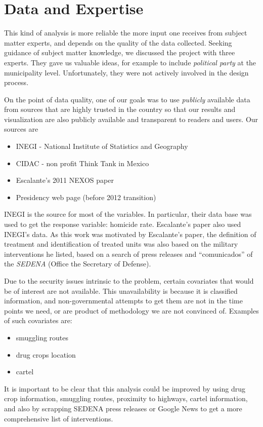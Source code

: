\documentclass{article}[11 pt]
\begin{document}
\section{Data and Expertise}
This kind of analysis is more reliable the more input one receives from subject matter experts, and depends on the quality of the data collected. Seeking guidance of subject matter knowledge, we discussed the project with three experts. %
They gave us valuable ideas, for example to include \emph{political party} at the municipality level. Unfortunately, they were not actively involved in the design process.

On the point of data quality, one of our goals was to use \emph{publicly} available data from sources that are highly trusted in the country so that our results and visualization are also publicly available and transparent to readers and users.
Our sources are
		\begin{itemize}
			\item INEGI - National Institute of Statistics and Geography
			\item CIDAC -  non profit Think Tank in Mexico
			\item Escalante's 2011 NEXOS paper 
			\item Presidency web page (before 2012 transition)
		\end{itemize}
		INEGI is the source for most of the variables. In particular, their data base was used to get the response variable: homicide rate. Escalante's paper also used INEGI's data. As this work was motivated by Escalante's paper, the definition of treatment and identification of treated units was also based on the military interventions he listed, based on a search of press releases and ``comunicados'' of the \emph{SEDENA} (Office the Secretary of Defense).
		
Due to the security issues intrinsic to the problem, certain covariates that would be of interest are not available. This unavailability is because it is classified information, and non-governmental attempts to get them are not in the time points we need, or are product of methodology we are not convinced of. Examples of such covariates are:
	\begin{itemize}
		\item smuggling routes
		\item drug crops location
		\item cartel
	\end{itemize}
	It is important to be clear that this analysis could be improved by using drug crop information, smuggling routes, proximity to highways, cartel information, and also by scrapping SEDENA press releases or Google News to get a more comprehensive list of interventions.
\end{document}
